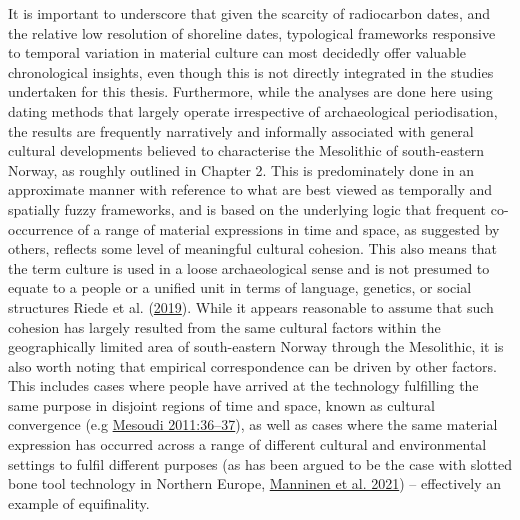 \documentclass[
  12pt,
  a4paper,
  oneside]{book}
\begin{document}
It is important to underscore that given the scarcity of radiocarbon dates, and the relative low resolution of shoreline dates, typological frameworks responsive to temporal variation in material culture can most decidedly offer valuable chronological insights, even though this is not directly integrated in the studies undertaken for this thesis. Furthermore, while the analyses are done here using dating methods that largely operate irrespective of archaeological periodisation, the results are frequently narratively and informally associated with general cultural developments believed to characterise the Mesolithic of south-eastern Norway, as roughly outlined in Chapter 2. This is predominately done in an approximate manner with reference to what are best viewed as temporally and spatially fuzzy frameworks, and is based on the underlying logic that frequent co-occurrence of a range of material expressions in time and space, as suggested by others, reflects some level of meaningful cultural cohesion. This also means that the term culture is used in a loose archaeological sense and is not presumed to equate to a people or a unified unit in terms of language, genetics, or social structures Riede et al. (\protect\hyperlink{ref-riede2019}{2019}). While it appears reasonable to assume that such cohesion has largely resulted from the same cultural factors within the geographically limited area of south-eastern Norway through the Mesolithic, it is also worth noting that empirical correspondence can be driven by other factors. This includes cases where people have arrived at the technology fulfilling the same purpose in disjoint regions of time and space, known as cultural convergence (e.g \protect\hyperlink{ref-mesoudi2011}{Mesoudi 2011:36--37}), as well as cases where the same material expression has occurred across a range of different cultural and environmental settings to fulfil different purposes (as has been argued to be the case with slotted bone tool technology in Northern Europe, \protect\hyperlink{ref-manninen2021}{Manninen et al. 2021}) -- effectively an example of equifinality.
\end{document}
